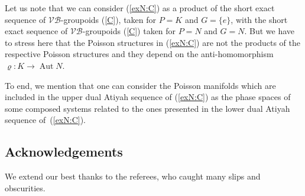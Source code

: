 \documentclass[pdftex]{sigma}
\renewcommand{\to}{\rightarrow}
\newcommand{\Aut}{\operatorname{Aut}}
\numberwithin{equation}{section}
\begin{document}
Let us note that we can consider (\ref{exN:C}) as a product of the short exact sequence of $\mathcal{V}\!\mathcal{B}$-groupoids (\ref{C}), taken for $P=K$ and $G=\{e\}$, with the short exact sequence of $\mathcal{V}\!\mathcal{B}$-groupoids (\ref{C}) taken for $P=N$ and $G=N$. But we have to stress here that the Poisson structures in (\ref{exN:C}) are not the products of the respective Poisson structures and they depend on the anti-homomorphism $\varrho\colon K\to \Aut N$.

To end, we mention that one can consider the Poisson manifolds which are included in the upper dual Atiyah sequence of (\ref{exN:C}) as the phase spaces of some composed systems related to the ones presented in the lower dual Atiyah sequence of~(\ref{exN:C}).

\subsection*{Acknowledgements}
We extend our best thanks to the referees, who caught many slips and obscurities.

\end{document}
